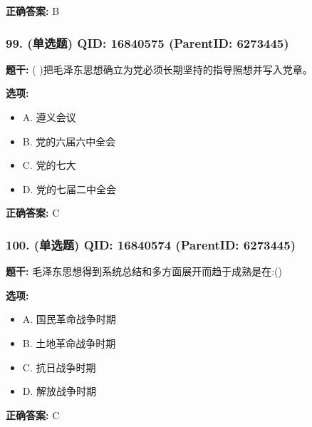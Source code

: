 \documentclass[12pt,UTF8]{ctexart}
\begin{document}
\textbf{正确答案:}
B

\vspace{0.3em}\hrulefill\vspace{0.7em}

\subsubsection*{99. (单选题) \small QID: 16840575 (ParentID: 6273445)}

\textbf{题干:}
( )把毛泽东思想确立为党必须长期坚持的指导照想并写入党章。



\textbf{选项:}
\begin{itemize}[leftmargin=*]

  \item A. 遵义会议

  \item B. 党的六届六中全会

  \item C. 党的七大

  \item D. 党的七届二中全会

\end{itemize}

\textbf{正确答案:}
C

\vspace{0.3em}\hrulefill\vspace{0.7em}

\subsubsection*{100. (单选题) \small QID: 16840574 (ParentID: 6273445)}

\textbf{题干:}
毛泽东思想得到系统总结和多方面展开而趋于成熟是在:()



\textbf{选项:}
\begin{itemize}[leftmargin=*]

  \item A. 国民革命战争时期

  \item B. 土地革命战争时期

  \item C. 抗日战争时期

  \item D. 解放战争时期

\end{itemize}

\textbf{正确答案:}
C
\end{document}
